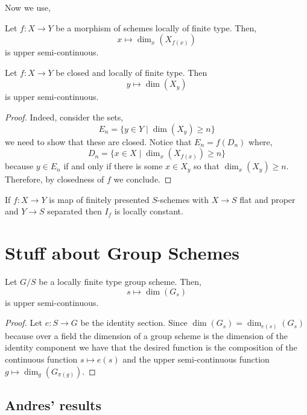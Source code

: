 \documentclass[12pt]{article}
\begin{document}
Now we use,
\begin{theorem}[EGA IV 13.1.3]
Let $f : X \to Y$ be a morphism of schemes locally of finite type. Then,
\[ x \mapsto \dim_{x}(X_{f(x)}) \]
is upper semi-continuous.
\end{theorem}

\begin{cor}
Let $f :X \to Y$ be closed and locally of finite type. Then
\[ y \mapsto \dim(X_y) \]
is upper semi-continuous.
\end{cor}

\begin{proof}
Indeed, consider the sets,
\[ E_n = \{ y \in Y \mid \dim(X_y) \ge n \} \]
we need to show that these are closed. Notice that $E_n = f(D_n)$ where,
\[ D_n = \{ x \in X \mid \dim_x(X_{f(x)}) \ge n \} \]
because $y \in E_n$ if and only if there is some $x \in X_y$ so that $\dim_x(X_y) \ge n$. Therefore, by closedness of $f$ we conclude. 
\end{proof}

\begin{cor}
If $f : X \to Y$ is map of finitely presented $S$-schemes with $X \to S$ flat and proper and $Y \to S$ separated then $I_f$ is locally constant. 
\end{cor}

\section{Stuff about Group Schemes}

\begin{prop}
Let $G / S$ be a locally finite type group scheme. Then,
\[ s \mapsto \dim(G_s) \]
is upper semi-continuous.
\end{prop}

\begin{proof}
Let $e : S \to G$ be the identity section. Since $\dim(G_s) = \dim_{e(s)}(G_s)$ because over a field the dimension of a group scheme is the dimension of the identity component we have that the desired function is the composition of the continuous function $s \mapsto e(s)$ and the upper semi-continuous function $g \mapsto \dim_g(G_{\pi(g)})$.
\end{proof}

\subsection{Andres' results}
\end{document}
